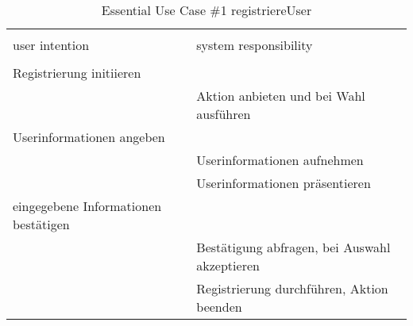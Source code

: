 \begin{table}[H]
\caption{Essential Use Case \#1 registriereUser }
\centering
\begin{tabular}{l l}
\\ [-0.5ex]

\hline\hline
\\ [-0.5ex]
user intention & system responsibility
\\ [1.5ex]
\hline
\\ [-0.5ex]
Registrierung initiieren				& 											\\[1ex]
										& Aktion anbieten und bei Wahl ausführen	\\[1ex]
Userinformationen angeben 				& 											\\[1ex] 
										& Userinformationen aufnehmen				\\[1ex]
										& Userinformationen präsentieren			\\[1ex]
eingegebene Informationen bestätigen	& 											\\[1ex]
										& Bestätigung abfragen, bei Auswahl akzeptieren  \\[1ex]
										& Registrierung durchführen, Aktion beenden	\\[1ex]


\hline
\end{tabular}
\label{tab:registrieren}
\end{table}

